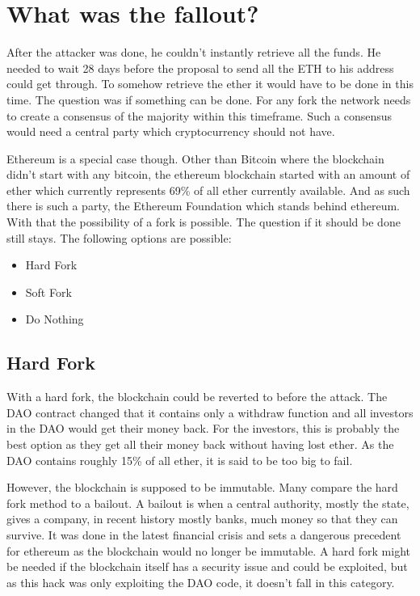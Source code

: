 \documentclass[a4paper, 11pt]{scrartcl}
\begin{document}
\section{What was the fallout?}

After the attacker was done, he couldn't instantly retrieve all the funds. He needed to wait 28 days before the proposal to send all the ETH to his address could get through. To somehow retrieve the ether it would have to be done in this time. The question was if something can be done. For any fork the network needs to create a consensus of the majority within this timeframe. Such a consensus would need a central party which cryptocurrency should not have. 

Ethereum is a special case though. Other than Bitcoin where the blockchain didn't start with any bitcoin, the ethereum blockchain started with an amount of ether which currently represents 69\% of all ether currently available. \cite{ethSupply} And as such there is such a party, the Ethereum Foundation which stands behind ethereum. \cite{eth} With that the possibility of a fork is possible. The question if it should be done still stays. The following options are possible:

\begin{itemize}
  \item Hard Fork
  \item Soft Fork
  \item Do Nothing
\end{itemize}

\subsection{Hard Fork}

With a hard fork, the blockchain could be reverted to before the attack. The DAO contract changed that it contains only a withdraw function and all investors in the DAO would get their money back. For the investors, this is probably the best option as they get all their money back without having lost ether. As the DAO contains roughly 15\% of all ether, it is said to be too big to fail. \cite{understandingDAO}

However, the blockchain is supposed to be immutable. Many compare the hard fork method to a bailout. A bailout is when a central authority, mostly the state, gives a company, in recent history mostly banks, much money so that they can survive. It was done in the latest financial crisis and sets a dangerous precedent for ethereum as the blockchain would no longer be immutable. A hard fork might be needed if the blockchain itself has a security issue and could be exploited, but as this hack was only exploiting the DAO code, it doesn't fall in this category. \cite{understandingDAO}
\end{document}
